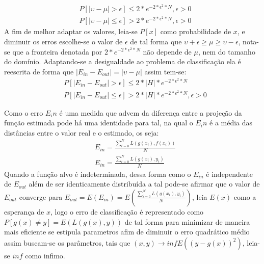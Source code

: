 \documentclass[pfc]{imetex}
\begin{document}
    \begin{equation}
        \begin{split}
            & P[|\upsilon - \mu|>\epsilon] \leq 2*e^{-2*\epsilon^2*N}, \epsilon>0 \\
            & P[|\upsilon - \mu|\leq\epsilon] > 2*e^{-2*\epsilon^2*N}, \epsilon>0
    \end{split}
    \end{equation}
    \newline
    A fim de melhor adaptar os valores, leia-se $P[x]$ como probabilidade de $x$, e diminuir os erros escolhe-se o valor de $\epsilon$ de tal forma que $\upsilon + \epsilon \geq \mu \geq \upsilon - \epsilon$, nota-se que a fronteira denotada por $2*e^{-2*\epsilon^2*N}$ não depende de $\mu$, nem do tamanho do domínio.
    \newline
    Adaptando-se a desigualdade ao problema de classificação ela é reescrita de forma que $|E_{in}-E_{out}|=|\upsilon-\mu|$ assim tem-se:
    \begin{equation}
        \begin{split}
             & P[|E_{in}-E_{out}|>\epsilon] \leq 2*|H|*e^{-2*\epsilon^2*N} \\ & P[|E_{in}-E_{out}|\leq\epsilon] > 2*|H|*e^{-2*\epsilon^2*N}, \epsilon>0
        \end{split}
    \end{equation}

    Como o erro $E_in$ é uma medida que advem da diferença entre a projeção da função estimada pode há uma identidade para tal, na qual o $E_in$ é a média das distâncias entre o valor real e o estimado, os seja:
    \begin{equation}
        \begin{split}
            & E_{in} = \frac{\sum\limits_{i=0}^N L(g(x_i),f(x_i))}{N} \\
            & E_{in} = \frac{\sum\limits_{i=0}^N L(g(x_i),y_i)}{N}
        \end{split}
    \end{equation}
    Quando a função alvo é indeterminada, dessa forma como o $E_{in}$ é independente de $E_{out}$ além de ser identicamente distribuída a tal pode-se afirmar que o valor de $E_{out}$ converge para $E_{out} = E(E_{in}) = E(\frac{\sum\limits_{i=0}^N L(g(x_i),y_i)}{N})$, leia $E(x)$ como a esperança de $x$, logo o erro de classificação é representado como $P[g(x) \neq y] = E(L(g(x),y))$ de tal forma para minimizar de maneira mais eficiente se estipula parametros afim de diminuir o erro quadrático médio assim buscam-se os parâmetros, tais que $(x, y) \rightarrow inf E((y-g(x))^2)$, leia-se $inf$ como infimo.
\end{document}
